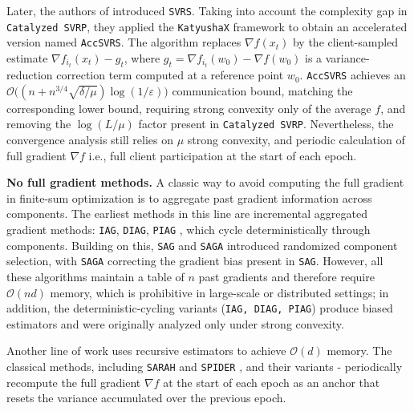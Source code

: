 \documentclass{article}
\begin{document}


Later, the authors of \cite{lin2023stochastic} introduced \texttt{SVRS}. Taking into account 
the complexity gap in \texttt{Catalyzed SVRP}, they applied the \texttt{KatyushaX} 
framework to obtain an accelerated version named \texttt{AccSVRS}. The 
algorithm replaces $\nabla f(x_t)$ by the client-sampled estimate 
$\nabla f_{i_t}(x_t) - g_t$, where $g_t = \nabla f_{i_t}(w_0) - \nabla f(w_0)$ 
is a variance-reduction correction term computed at a reference point $w_0$.
\texttt{AccSVRS} achieves an $\mathcal{O}\bigl((n + n^{3/4}\sqrt{\delta/\mu})\log(1/\varepsilon)\bigr)$ 
communication bound, matching the corresponding lower bound, requiring 
strong convexity only of the average $f$, and removing the $\log(L/\mu)$ 
factor present in \texttt{Catalyzed SVRP}. Nevertheless, the convergence analysis still relies on $\mu$ strong convexity, and periodic calculation of full gradient $\nabla f$ i.e., full client participation at the start of each epoch.  

\textbf{No full gradient methods.} 
A classic way to avoid computing the full gradient in finite-sum optimization 
is to aggregate past gradient information across components. The earliest 
methods in this line are incremental aggregated gradient methods: \texttt{IAG}, 
\texttt{DIAG}, \texttt{PIAG} \cite{gurbuzbalaban2017convergence, 
mokhtari2018surpassing, vanli2018global}, which cycle deterministically through 
components. Building on this, \texttt{SAG} \cite{roux2012stochastic} and 
\texttt{SAGA} \cite{defazio2014saga} introduced randomized component selection, 
with \texttt{SAGA} correcting the gradient bias present in \texttt{SAG}. 
However, all these algorithms maintain a table of $n$ past gradients and 
therefore require $\mathcal{O}(nd)$ memory, which is prohibitive in large-scale 
or distributed settings; in addition, the deterministic-cycling variants 
(\texttt{IAG, DIAG, PIAG}) produce biased estimators and were originally 
analyzed only under strong convexity.

Another line of work uses recursive estimators to achieve  $\mathcal{O}(d)$ memory. The classical methods, including \texttt{SARAH} 
\cite{nguyen2017sarah} and \texttt{SPIDER} \cite{fang2018spider}, and their variants - periodically recompute the full gradient $\nabla f$ at the start of each epoch as an anchor that resets the variance accumulated over the previous epoch. 
\end{document}
